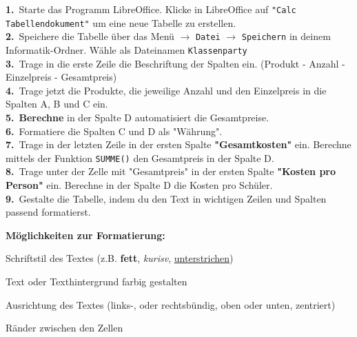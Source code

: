 \documentclass[a4paper, 12pt]{article}
\begin{document}
\large
\TITEL
\textbf{1.}\ Starte das Programm LibreOffice. Klicke in LibreOffice auf \texttt{"Calc Tabellendokument"} um eine neue Tabelle zu erstellen.\\

\textbf{2.}\ Speichere die Tabelle über das Menü $\rightarrow$ \texttt{Datei} $\rightarrow$ \texttt{Speichern} in deinem Informatik-Ordner. Wähle als Dateinamen \texttt{Klassenparty}\\

\textbf{3.}\ Trage in die erste Zeile die Beschriftung der Spalten ein. (Produkt - Anzahl - Einzelpreis - Gesamtpreis)\\

\textbf{4.}\ Trage jetzt die Produkte, die jeweilige Anzahl und den Einzelpreis in die Spalten A, B und C ein.\\

\textbf{5.}\ \textbf{Berechne} in der Spalte D automatisiert die Gesamtpreise.\\

\textbf{6.}\ Formatiere die Spalten C und D als "Währung".\\

\textbf{7.}\ Trage in der letzten Zeile in der ersten Spalte \textbf{"Gesamtkosten"} ein. Berechne mittels der Funktion \texttt{SUMME()} den Gesamtpreis in der Spalte D.\\

\textbf{8.}\ Trage unter der Zelle mit "Gesamtpreis" in der ersten Spalte \textbf{"Kosten pro Person"} ein. Berechne in der Spalte D die Kosten pro Schüler.\\

\textbf{9.}\ Gestalte die Tabelle, indem du den Text in wichtigen Zeilen und Spalten passend formatierst.

\textbf{Möglichkeiten zur Formatierung:}

Schriftstil des Textes (z.B. \textbf{fett}, \textit{kurisv}, \underline{unterstrichen})

Text oder Texthintergrund farbig gestalten

Ausrichtung des Textes (links-, oder rechtsbündig, oben oder unten, zentriert)

Ränder zwischen den Zellen

\newpage
\end{document}
